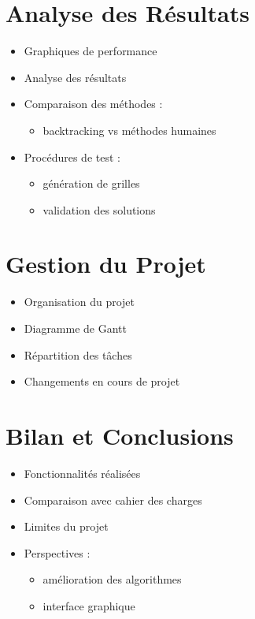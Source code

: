 \documentclass[a4paper]{article}
\begin{document}
\section{Analyse des Résultats}

\begin{itemize}
    \item Graphiques de performance
    \item Analyse des résultats
    \item Comparaison des méthodes :
    \begin{itemize}
        \item backtracking vs méthodes humaines
    \end{itemize}
    \item Procédures de test :
    \begin{itemize}
        \item génération de grilles
        \item validation des solutions
    \end{itemize}
\end{itemize}

\section{Gestion du Projet}

\begin{itemize}
    \item Organisation du projet
    \item Diagramme de Gantt
    \item Répartition des tâches
    \item Changements en cours de projet
\end{itemize}

\section{Bilan et Conclusions}

\begin{itemize}
    \item Fonctionnalités réalisées
    \item Comparaison avec cahier des charges
    \item Limites du projet
    \item Perspectives :
    \begin{itemize}
        \item amélioration des algorithmes
        \item interface graphique
    \end{itemize}
\end{itemize}
\end{document}
